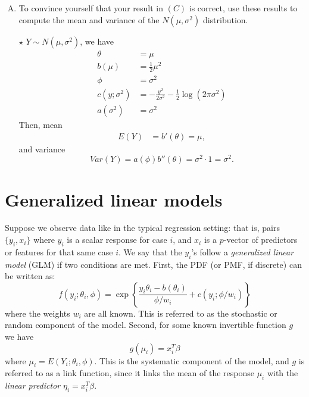 \documentclass[11pt]{article}
\newcommand{\jie}{$\star$ }
\newcommand{\half}{\frac{1}{2}}
\begin{document}
\begin{enumerate}[(A)]
\item To convince yourself that your result in $(C)$ is correct, use these results to compute the mean and variance of the $N(\mu, \sigma^2)$ distribution.  

\bigskip
\jie
$Y \sim N(\mu,\sigma^2)$, we have
\begin{align*}
    \theta &= \mu \\
    b(\mu) &= \half \mu^2 \\
    \phi &= \sigma^2 \\
    c(y;\sigma^2) &= -\frac{y^2}{2\sigma^2} - \half \log (2\pi\sigma^2) \\
    a(\sigma^2) &= \sigma^2
\end{align*}
Then, mean
\begin{align*}
    E(Y) &= b'(\theta) =\mu,
\end{align*}
and variance
$$Var(Y) = a(\phi)b''(\theta) = \sigma^2 \cdot 1 = \sigma^2.$$

\end{enumerate}


\section{Generalized linear models}  

Suppose we observe data like in the typical regression setting: that is, pairs $\{y_i, x_i\}$ where $y_i$ is a scalar response for case $i$, and $x_i$ is a $p$-vector of predictors or features for that same case $i$.  We say that the $y_i$'s follow a \textit{generalized linear model} (GLM) if two conditions are met.  First, the PDF (or PMF, if discrete) can be written as:  
$$
f(y_i; \theta_i,  \phi)  = \exp \left\{ \frac{y_i \theta_i - b(\theta_i)}{\phi/w_i} + c(y_i; \phi/w_i)   \right \}
$$
where the weights $w_i$ are all known.  This is referred to as the stochastic or random component of the model.  Second, for some known invertible function $g$ we have
$$
g(\mu_i) = x_i^T \beta
$$
where $\mu_i = E(Y_i; \theta_i, \phi)$.  This is the systematic component of the model, and $g$ is referred to as a link function, since it links the mean of the response $\mu_i$ with the \emph{linear predictor} $\eta_i = x_i^T \beta$.  
\end{document}
